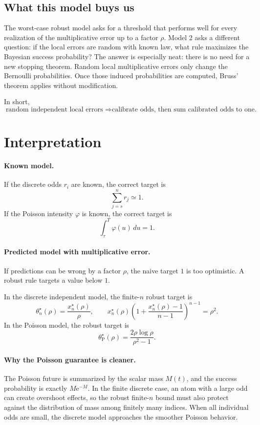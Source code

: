 \documentclass[11pt,a4paper]{article}
\newcommand{\e}{\mathrm e}
\begin{document}
\subsection{What this model buys us}

The worst-case robust model asks for a threshold that performs well for every
realization of the multiplicative error up to a factor $\rho$.  Model 2 asks a
different question: if the local errors are random with known law, what rule
maximizes the Bayesian success probability?  The answer is especially neat:
there is no need for a new stopping theorem.  Random local multiplicative errors
only change the Bernoulli probabilities.  Once those induced probabilities are
computed, Bruss' theorem applies without modification.

In short,
\[
  \boxed{
  \text{random independent local errors }
  \Longrightarrow
  \text{calibrate odds, then sum calibrated odds to one.}
  }
\]


\section{Interpretation}

\paragraph{Known model.}
If the discrete odds \(r_i\) are known, the correct target is
\[
  \sum_{j=s}^n r_j\simeq1.
\]
If the Poisson intensity \(\varphi\) is known, the correct target is
\[
  \int_\tau^T\varphi(u)\,du=1.
\]

\paragraph{Predicted model with multiplicative error.}
If predictions can be wrong by a factor \(\rho\), the naive target \(1\) is too
optimistic.  A robust rule targets a value below \(1\).

In the discrete independent model, the finite-\(n\) robust target is
\[
  \theta_n^\star(\rho)=\frac{x_n^\star(\rho)}{\rho},
  \qquad
  x_n^\star(\rho)
  \left(1+\frac{x_n^\star(\rho)-1}{n-1}\right)^{n-1}=\rho^2.
\]
In the Poisson model, the robust target is
\[
  \theta^\star_{\mathrm P}(\rho)
  =
  \frac{2\rho\log\rho}{\rho^2-1}.
\]

\paragraph{Why the Poisson guarantee is cleaner.}
The Poisson future is summarized by the scalar mass \(M(t)\), and the success
probability is exactly \(M\e^{-M}\).  In the finite discrete case, an atom with a
large odd can create overshoot effects, so the robust finite-\(n\) bound must
also protect against the distribution of mass among finitely many indices.  When
all individual odds are small, the discrete model approaches the smoother
Poisson behavior.
\end{document}
